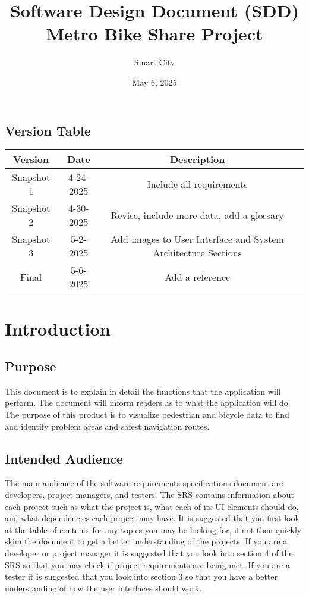 \documentclass{article}
\title{Software Design Document (SDD) \\Metro Bike Share Project}
\author{Smart City}
\date{May 6, 2025}
\begin{document}
\maketitle
\newpage

\tableofcontents
\newpage

\begin{center}

\section*{Version Table}
\begin{tabular}{|c|c|c|c|}
\hline
\textbf{Version} & \textbf{Date} & \textbf{Description} \\
\hline
Snapshot 1 & 4-24-2025 & Include all requirements\\
\hline
Snapshot 2 & 4-30-2025 & Revise, include more data, add a glossary\\
\hline
Snapshot 3 & 5-2-2025 & Add images to User Interface and System Architecture Sections\\
\hline
Final & 5-6-2025 & Add a reference \\
\hline
\end{tabular}
\end{center}

\newpage

\section{Introduction}
\subsection{Purpose}
This document is to explain in detail the functions that the application will perform. The document will inform readers as to what the application will do. The purpose of this product is to visualize pedestrian and bicycle data to find and identify problem areas and safest navigation routes.

\subsection{Intended Audience}
The main audience of the software requirements specifications document are developers, project managers, and testers. The SRS contains information about each project such as what the project is, what each of its UI elements should do, and what dependencies each project may have. It is suggested that you first look at the table of contents for any topics you may be looking for, if not then quickly skim the document to get a better understanding of the projects. If you are a developer or project manager it is suggested that you look into section 4 of the SRS so that you may check if project requirements are being met. If you are a tester it is suggested that you look into section 3 so that you have a better understanding of how the user interfaces should work.
\end{document}
